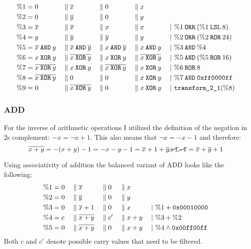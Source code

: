 \begin{align*}
  \binp{1}{0}{\neg{x}}{0}{x}\\
  \binp{2}{0}{\neg{y}}{0}{y}\\
  \btrans{3}{\neg{x}}{\neg{x}}{x}{x}{\%1 \borr (\%1 \blsl 8)}\\
  \btrans{4}{y}{\neg{y}}{\neg{y}}{y}{\%2 \borr (\%2 \bror 24)}\\
  \btrans{5}{\neg{x} \band y}{\neg{x} \band \neg{y}}{x \band \neg{y}}{x \band y}{\%3 \band \%4}\\
  \btrans{6}{x \bxor y}{\neg{x \bxor y}}{x \bxor y}{\neg{x \bxor y}}{\%5 \band (\%5 \bror 16)}\\
  \btrans{7}{\neg{x \bxor y}}{x \bxor y}{\neg{x \bxor y}}{x \bxor y}{\%6 \bror 8}\\
  \btrans{8}{\neg{x \bxor y}}{0}{0}{x \bxor y}{\%7 \band \hex{ff0000ff}}\\
  \btrans{9}{0}{\neg{x \bxor y}}{0}{x \bxor y}{\trans21 (\%8)}
\end{align*}

\subsubsection{ADD}
For the inverse of arithmetic operations I utilized the definition of the negation in 2s complement: $-x = \neg{x} + 1$.
This also means that $\neg{x} = -x - 1$ and therefore:
\begin{equation*}
  \neg{x + y} = - (x + y) - 1 = - x - y - 1 = \neg{x} + 1 + \neg{y} \cancel{+ 1} \cancel{- 1} = \neg{x} + \neg{y} + 1
\end{equation*}

Using associativity of addition the balanced variant of ADD looks like the following:
\begin{align*}
  \%1 &= 0 && \bsep \neg{x} &&\bsep 0 &&\bsep x      &&\\
  \%2 &= 0 && \bsep \neg{y} &&\bsep 0 &&\bsep y      &&\\
  \%3 &= 0 && \bsep \neg{x}+1 &&\bsep 0 &&\bsep x    &&\;|\ \%1 + \hex{00010000}\\
  \%4 &= c && \bsep \neg{x+y} &&\bsep c' &&\bsep x+y &&\;|\ \%3 + \%2\\
  \%5 &= 0 && \bsep \neg{x+y} &&\bsep 0 &&\bsep x+y  &&\;|\ \%4 \land \hex{00ff00ff}
\end{align*}
Both $c$ and $c'$ denote possible carry values that need to be filtered.

